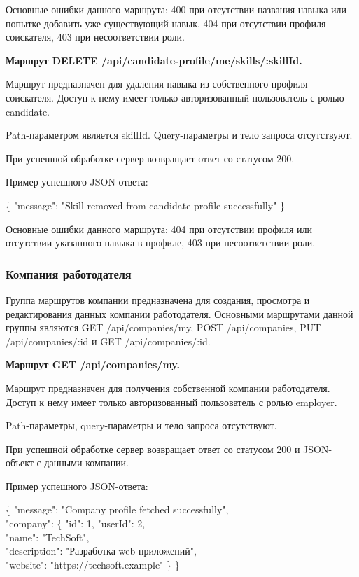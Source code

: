 Основные ошибки данного маршрута: 400 при отсутствии названия навыка или попытке добавить уже существующий навык, 404 при отсутствии профиля соискателя, 403 при несоответствии роли.

\textbf{Маршрут DELETE /api/candidate-profile/me/skills/:skillId.}

Маршрут предназначен для удаления навыка из собственного профиля соискателя. Доступ к нему имеет только авторизованный пользователь с ролью candidate.

Path-параметром является skillId. Query-параметры и тело запроса отсутствуют.

При успешной обработке сервер возвращает ответ со статусом 200.

Пример успешного JSON-ответа:

\begin{flushleft}
	\small\ttfamily
	\{ "message": "Skill removed from candidate profile successfully" \}
\end{flushleft}

Основные ошибки данного маршрута: 404 при отсутствии профиля или отсутствии указанного навыка в профиле, 403 при несоответствии роли.

\subsubsection{Компания работодателя}

Группа маршрутов компании предназначена для создания, просмотра и редактирования данных компании работодателя. Основными маршрутами данной группы являются GET /api/companies/my, POST /api/companies, PUT /api/companies/:id и GET /api/companies/:id.

\textbf{Маршрут GET /api/companies/my.}

Маршрут предназначен для получения собственной компании работодателя. Доступ к нему имеет только авторизованный пользователь с ролью employer.

Path-параметры, query-параметры и тело запроса отсутствуют.

При успешной обработке сервер возвращает ответ со статусом 200 и JSON-объект с данными компании.

Пример успешного JSON-ответа:

\begin{flushleft}
	\small\ttfamily
	\{ "message": "Company profile fetched successfully",\\
	"company": \{ "id": 1, "userId": 2,\\
	"name": "TechSoft",\\
	"description": "Разработка web-приложений",\\
	"website": "https://techsoft.example" \} \}
\end{flushleft}

